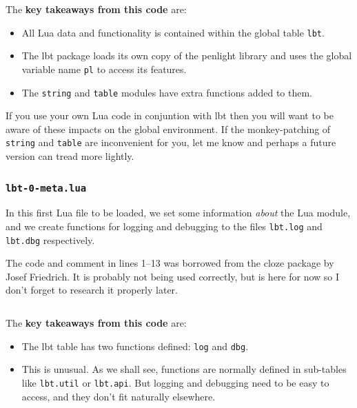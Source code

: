 \documentclass[11pt]{article}
\newcommand{\lbtlabel}{\textsf{lbt}}
\newcommand{\lbtpkg}{\texttt{lbt}}
\begin{document}
\inputminted{latex}{media/impl-lbt.sty}

The \textbf{key takeaways from this code} are:
\begin{itemize}
  \item All Lua data and functionality is contained within the global table \lbtpkg{}.
  \item The \lbtlabel{} package loads its own copy of the \textsf{penlight} library and uses the global variable name \texttt{pl} to access its features.
  \item The \texttt{string} and \texttt{table} modules have extra functions added to them.
\end{itemize}

If you use your own Lua code in conjuntion with \lbtlabel{} then you will want to be aware of these impacts on the global environment. If the monkey-patching of \texttt{string} and \texttt{table} are inconvenient for you, let me know and perhaps a future version can tread more lightly.


\subsubsection{\texttt{lbt-0-meta.lua}}

In this first Lua file to be loaded, we set some information \emph{about} the Lua module, and we create functions for logging and debugging to the files \texttt{lbt.log} and \texttt{lbt.dbg} respectively.

The code and comment in lines 1--13 was borrowed from the \textsf{cloze} package by Josef Friedrich. It is probably not being used correctly, but is here for now so I don't forget to research it properly later.

\inputminted{lua}{media/impl-lbt-0-meta.lua}

The \textbf{key takeaways from this code} are:
\begin{itemize}
  \item The \lbtlabel{} table has two functions defined: \texttt{log} and \texttt{dbg}.
  \item This is unusual. As we shall see, functions are normally defined in sub-tables like \texttt{lbt.util} or \texttt{lbt.api}. But logging and debugging need to be easy to access, and they don't fit naturally elsewhere.
\end{itemize}

\end{document}
